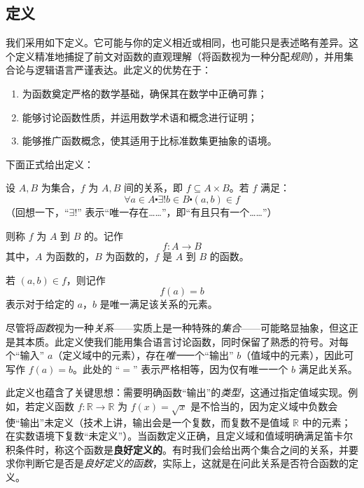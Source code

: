 
\subsection{定义}

我们采用如下定义。它可能与你的定义相近或相同，也可能只是表述略有差异。这个定义精准地捕捉了前文对函数的直观理解（将函数视为一种分配\emph{规则}），并用集合论与逻辑语言严谨表达。此定义的优势在于：

\begin{enumerate}[label=(\alph*)]
    \item 为函数奠定严格的数学基础，确保其在数学中正确可靠；
    \item 能够讨论函数性质，并运用数学术语和概念进行证明；
    \item 能够推广函数概念，使其适用于比标准数集更抽象的语境。
\end{enumerate}
下面正式给出定义：

\begin{definition}
    设 $A, B$ 为集合，$f$ 为 $A, B$ 间的关系，即 $f \subseteq A \times B$。若 $f$ 满足：
    \[\forall a \in A \centerdot \exists! b \in B \centerdot (a, b) \in f\]
    （回想一下，``$\exists!$'' 表示``唯一存在……''，即``有且只有一个……''）

    则称 $f$ 为 $A$ 到 $B$ 的。记作
    \[f:A \to B\]
    其中，$A$ 为函数的，$B$ 为函数的，$f$ 是 $A$ 到 $B$ 的函数。

    若 $(a,b) \in f$，则记作
    \[f(a) = b\]
    表示对于给定的 $a$，$b$ 是唯一满足该关系的元素。
\end{definition}

尽管将\emph{函数}视为一种\emph{关系}——实质上是一种特殊的\emph{集合}——可能略显抽象，但这正是其本质。此定义使我们能用集合语言讨论函数，同时保留了熟悉的符号。对每个``输入'' $a$（定义域中的元素），存在\emph{唯一}一个``输出'' $b$（值域中的元素），因此可写作 $f(a) = b$。此处的 ``$=$'' 表示严格相等，因为仅有唯一一个 $b$ 满足此关系。

此定义也蕴含了关键思想：需要明确函数``输出''的\emph{类型}，这通过指定值域实现。例如，若定义函数 $f : \mathbb{R} \to \mathbb{R}$ 为 $f(x) = \sqrt{x}$ 是不恰当的，因为定义域中负数会使``输出''未定义（技术上讲，输出会是一个复数，而复数不是值域 $\mathbb{R}$ 中的元素；在实数语境下复数``未定义''）。当函数定义正确，且定义域和值域明确满足笛卡尔积条件时，称这个函数是\textbf{良好定义的}。有时我们会给出两个集合之间的关系，并要求你判断它是否是\emph{良好定义的函数}，实际上，这就是在问此关系是否符合函数的定义。

